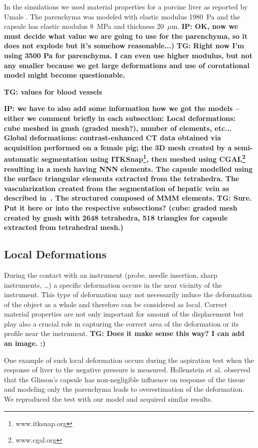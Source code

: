 \documentclass{llncs}
\newcommand{\TG}[1]{{\color{blue}\textbf{TG: #1}}}
\newcommand{\IP}[1]{{\color{cyan}\textbf{IP: #1}}}
\begin{document}
In the simulations we used material properties for a porcine liver as
reported by Umale \cite{Umale2013}. The
parenchyma was modeled with elastic modulus 1980~Pa and the capsule has
elastic modulus 8~MPa and thickness 20~$\mu$m.
\IP{OK, now we must decide what value we are going to use for the parenchyma, so it does not explode but it's somehow reasonable...)}
\TG{Right now I'm using 3500 Pa for parenchyma. I can even use higher
modulus, but not any smaller because we get large deformations and use of
corotational model might become questionable.}

\TG{values for blood vessels}

\IP{we have to also add some information how we got the models -- either we comment briefly in each subsection:
Local deformations: cube meshed in gmsh (graded mesh?), number of elements, etc...
Global deformations: contrast-enhanced CT data obtained via acquisition performed on a female pig; the 3D mesh created by a
semi-automatic segmentation using ITKSnap\footnote{www.itksnap.org}, then meshed using CGAL\footnote{www.cgal.org} \cite{Boltcheva2009} resulting in a mesh having 
NNN elements. The capsule modelled using the surface triangular elements extracted from the tetrahedra. The vascularization 
created from the segmentation of hepatic vein as described in~\cite{Peterlik2012}. The structured composed of MMM elements.}
\TG{Sure. Put it here or into the respective subsections? (cube: graded
  mesh created by gmsh with 2648 tetrahedra, 518 triangles for capsule
extracted from tetrahedral mesh.)}



\subsection{Local Deformations} %

During the contact with an instrument (probe, needle insertion, sharp
instruments, \ldots) a specific deformation occurs in the near vicinity of
the instrument. This type of deformation may not necessarily induce the
deformation of the object as a whole and therefore can be considered as
local. Correct material properties are not only important for amount of the
displacement but play also a crucial role in capturing the correct area of
the deformation or its profile near the instrument.
\TG{Does it make sense this way? I can add an image. :)}

One example of such local deformation occurs during the aspiration test
when the response of liver to the negative pressure is measured.
Hollenstein et al. \cite{Hollenstein2006} observed that the Glisson's
capsule has non-negligible influence on response of the tissue and modeling
only the parenchyma leads to overestimation of the deformation. We
reproduced the test with our model and acquired similar results.
\end{document}
